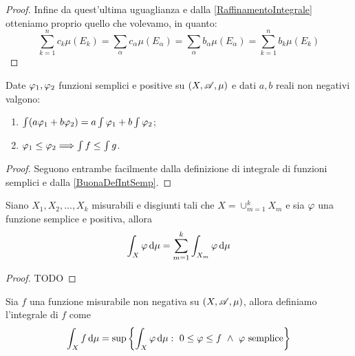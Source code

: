 \begin{proof}
	Infine da quest'ultima uguaglianza e dalla \cref{RaffinamentoIntegrale} otteniamo proprio quello che volevamo, in quanto:
	\begin{equation*}
		\sum_{k=1}^n c_k \mu(E_k)=\sum_\alpha c_\alpha\mu(E_\alpha)=\sum_\alpha b_\alpha\mu(E_\alpha)=\sum_{k=1}^n b_k \mu(E_k)
	\end{equation*}
\end{proof}

\begin{proposition}\label{PropIntSemp}
	Date $\varphi_1,\varphi_2$ funzioni semplici e positive su $(X,\mathscr A,\mu)$ e dati $a,b$ reali non negativi valgono:
	\begin{enumerate}
		\item $\int (a\varphi_1+b\varphi_2)=a\int \varphi_1+b\int \varphi_2$; \label{PIS:add}
		\item $\varphi_1\le \varphi_2\Longrightarrow \int f\le \int g$. \label{PIS:mono}
	\end{enumerate}
\end{proposition}
\begin{proof}
	Seguono entrambe facilmente dalla definizione di integrale di funzioni semplici e dalla \cref{BuonaDefIntSemp}.
\end{proof}

\begin{proposition}\label{IntSempSpezzato}
	Siano $X_1,X_2,\dots,X_k$ misurabili e disgiunti tali che $X=\cup_{m=1}^kX_m$ e sia $\varphi$ una funzione semplice e positiva, allora
	\begin{equation*}
		\int_X \varphi \,\mathrm d \mu=\sum_{m=1}^k \int_{X_m}\varphi\,\mathrm d \mu
	\end{equation*}
\end{proposition}
\begin{proof}
	TODO
\end{proof}



\begin{definition}\label{DefIntPos}
	Sia $f$ una funzione misurabile non negativa su $(X,\mathscr A,\mu)$, allora definiamo l'integrale di $f$ come
	\begin{equation*}
		\int_Xf\de\mu=\sup\left\{\int_X\simp\de \mu:\ 0\le \simp\le f\ \wedge\ \simp \text{ semplice}\right\}
	\end{equation*}
\end{definition}

